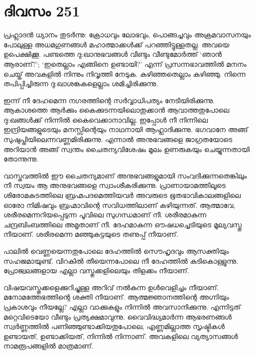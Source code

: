 \section{ദിവസം 251}


പ്രഹ്ലാദന്‍ ധ്യാനം തുടര്‍ന്നു: ക്രോധവും ലോഭവും, പൊങ്ങച്ചവും അക്രമവാസനയും പോലുള്ള അധമഗുണങ്ങള്‍ മഹാത്മാക്കള്‍ക്ക് പറഞ്ഞിട്ടുള്ളതല്ല. അവയെ ഉപെക്ഷിക്കൂ. പണ്ടത്തെ ദു:ഖാനുഭവങ്ങള്‍ വീണ്ടും വീണ്ടുമോര്‍ത്ത് ‘ഞാന്‍ ആരാണ്?’; ‘ഇതെല്ലാം എങ്ങിനെ ഉണ്ടായി?’ എന്ന് പ്രസന്നഭാവത്തില്‍ മനനം ചെയ്ത് അവകളില്‍ നിന്നും നിവൃത്തി നേടുക. കഴിഞ്ഞതെല്ലാം കഴിഞ്ഞു. നിന്നെ തപിപ്പിച്ചിരുന്ന ദു:ഖാശങ്കകളെല്ലാം ശമിച്ചിരിക്കുന്നു.

ഇന്ന് നീ ദേഹമെന്ന നഗരത്തിന്റെ സര്‍വ്വാധിപത്യം നേടിയിരിക്കുന്നു. ആകാശത്തെ ആര്‍ക്കും കൈക്കുടന്നയിലൊതുക്കാന്‍ ആവാത്തതുപോലെ ദു:ഖങ്ങള്‍ക്ക് നിന്നില്‍ കൈവെക്കാനാവില്ല. ഇപ്പോള്‍ നീ നിന്നിലെ  ഇന്ദ്രിയങ്ങളുടെയും മനസ്സിന്റെയും നാഥനായി ആഹ്ലാദിക്കുന്നു. ഭഗവാനേ  അങ്ങ് സുഷുപ്തിയിലെന്നവണ്ണമിരിക്കുന്നു. എന്നാല്‍ അനുഭവങ്ങളെ ജാഗ്രതയോടെ അറിയാന്‍ അങ്ങ് സ്വന്തം ചൈതന്യവിശേഷം മൂലം ഉണരുകയും ചെയ്യുന്നതായി തോന്നുന്നു.   

വാസ്തവത്തില്‍ ഈ ചൈതന്യമാണ് അനുഭവങ്ങളുമായി സംവദിക്കുന്നതെങ്കിലും നീ സ്വയം ആ അനുഭവങ്ങളെ സ്വാംശീകരിക്കുന്നു. പ്രാണായാമത്തിലൂടെ ശിരോമകുടത്തിലെ ബ്രഹ്മപദമെത്തിയവര്‍ അവരുടെ ഭൂതഭാവികാലങ്ങളിലെ ഓരോ നിമിഷവും ബ്രഹ്മാവിന്റെ സവിധത്തിലാണ് കഴിയുന്നത്. ആത്മാവേ, ശരീരമെന്നറിയപ്പെടുന്ന പൂവിലെ സുഗന്ധമാണ് നീ. ശരീരമാകുന്ന ചന്ദ്രബിംബത്തിലെ അമൃതാണ് നീ. ദേഹമാകുന്ന ഔഷധച്ചെടിയുടെ മൂല്യവസ്തു നീയാണ്. ശരീരമെന്ന മഞ്ഞുകട്ടയുടെ തണുപ്പ് നീയാണ്.       

പാലില്‍ വെണ്ണയെന്നതുപോലെ ദേഹത്തില്‍ സൌഹൃദവും ആസക്തിയും സഹജമായുണ്ട്. വിറകില്‍ തീയെന്നപോലെ നീ ദേഹത്തില്‍ കുടികൊള്ളുന്നു. പ്രോജ്വലങ്ങളായ എല്ലാ വസ്തുക്കളിലെയും തിളക്കം നീയാണ്. 

വിഷയവസ്തുക്കളെക്കുറിച്ചുള്ള അറിവ് നല്‍കുന്ന ഉള്‍വെളിച്ചം നീയാണ്. മനോമത്തേഭത്തിന്റെ ശക്തി നീയാണ്. ആത്മജ്ഞാനത്തിന്റെ അഗ്നിയും പ്രകാശവും നീയല്ലേ? എല്ലാ വാക്കുകളും നിന്നില്‍ അവസാനിക്കുന്നു. എന്നിട്ടത് മറ്റെവിടെയോ വീണ്ടും പ്രത്യക്ഷമാവുന്നു.    വൈവിദ്ധ്യമാര്‍ന്ന ആഭരണങ്ങള്‍ സ്വര്‍ണ്ണത്തില്‍ പണിഞ്ഞുണ്ടാക്കിയതുപോലെ, എണ്ണമില്ലാത്ത സൃഷ്ടികള്‍ ഉണ്ടായത്, ഉണ്ടാക്കിയത്, നിന്നില്‍ നിന്നാണ്. അവകളിലെ വ്യത്യാസങ്ങള്‍ നാമരൂപങ്ങളില്‍ മാത്രമാണ്.


